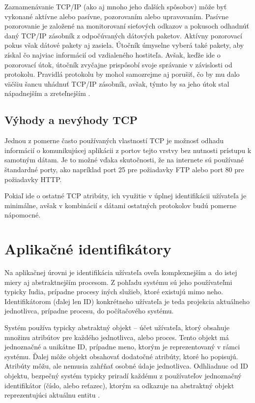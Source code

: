 \documentclass[
  printed, %
  table,   %
  lof,     %
  nolot,   %
  nocover
]{fithesis3}
\begin{document}
Zaznamenávanie TCP/IP (ako aj mnoho jeho ďalších spôsobov) môže byť vykonané
aktívne alebo pasívne, pozorovaním alebo upravovaním. Pasívne pozorovanie je
založené na monitorovaní sieťových odkazov a pokusoch odhadnúť daný TCP/IP
zásobník z odpočúvaných dátových paketov. Aktívny pozorovací pokus však dátové
pakety aj zasiela. Útočník úmyselne vyberá také pakety, aby získal čo najviac
informácií od vzdialeného hostiteľa. Avšak, keďže ide o pozorovací útok,
útočník zvyčajne prispôsobí svoje správanie v závislosti od protokolu. Pravidlá
protokolu by mohol samozrejme aj porušiť, čo by mu dalo väčšiu šancu uhádnuť
TCP/IP zásobník, avšak, týmto by sa jeho útok stal nápadnejším a zreteľnejším \cite{FIDIS:TCP}.
 
\subsection{Výhody a nevýhody TCP}
Jednou z pomerne často používaných vlastností TCP je možnosť odhadu informácií
o komunikujúcej aplikácii z portov tejto vrstvy bez nutnosti prístupu k samotným
dátam. Je to možné vďaka skutočnosti, že na internete sú používané štandardné
porty, ako napríklad port 25 pre požiadavky FTP alebo port 80 pre požiadavky HTTP.

Pokiaľ ide o ostatné TCP atribúty, ich využitie v úplnej identifikácii
užívateľa je minimálne, avšak v kombinácií s dátami ostatných protokolov budú
pomerne nápomocné.

\section{Aplikačné identifikátory}
Na aplikačnej úrovni je identifikácia užívateľa oveľa komplexnejším a~do istej
miery aj abstraktnejším procesom. Z pohľadu systému sú jeho používateľmi
typicky ľudia, prípadne procesy iných služieb, ktoré existujú mimo neho.
Identifikátorom (ďalej len ID) konkrétneho užívateľa je teda projekcia aktuálneho
jednotlivca, prípadne procesu, do počítačového systému.

Systém používa typicky
abstraktný objekt -- účet užívateľa, ktorý obsahuje množinu atribútov pre
každého jednotlivca, alebo proces. Tento objekt má jednoznačné a unikátne
ID, prípadne meno, ktorým je reprezentovaný v rámci systému. Ďalej môže objekt
obsahovať dodatočné atribúty, ktoré ho popisujú. Atribúty môžu, ale nemusia
zahŕňať osobné údaje jednotlivca. Odhliadnuc od ID objektu, bezpečný systém
typicky priradí každému z používateľov jednoznačný identifikátor (číslo, alebo
reťazec), ktorým sa odkazuje na abstraktný objekt reprezentujúci aktuálnu
entitu \cite{Todorov:2007:EX}. 
\end{document}
